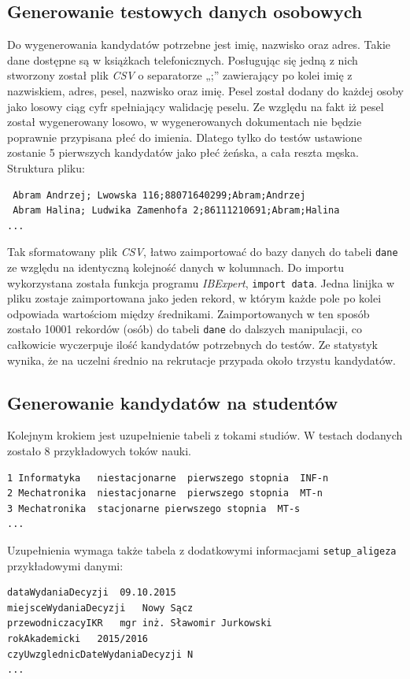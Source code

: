 \subsection{ Generowanie testowych danych osobowych}

Do wygenerowania kandydatów potrzebne jest imię, nazwisko oraz adres. Takie dane dostępne są w książkach telefonicznych. Posługując się jedną z nich stworzony został plik \emph{CSV} o separatorze „;” zawierający po kolei imię z nazwiskiem, adres, pesel, nazwisko oraz imię. Pesel został dodany do każdej osoby jako losowy ciąg cyfr spełniający walidację peselu. Ze względu na fakt iż pesel został wygenerowany losowo,  w wygenerowanych dokumentach nie będzie poprawnie przypisana płeć do imienia. Dlatego tylko do testów ustawione zostanie 5 pierwszych kandydatów jako płeć żeńska, a cała reszta męska.\\
Struktura pliku:
\begin{lstlisting}
 Abram Andrzej; Lwowska 116;88071640299;Abram;Andrzej
 Abram Halina; Ludwika Zamenhofa 2;86111210691;Abram;Halina
...

\end{lstlisting}

Tak sformatowany plik \emph{CSV},  łatwo zaimportować do bazy danych do tabeli \texttt{dane} ze względu na identyczną kolejność danych w kolumnach. Do importu wykorzystana została funkcja programu \emph{IBExpert}, \texttt{import data}. Jedna linijka w pliku zostaje zaimportowana jako jeden rekord, w którym każde pole po kolei odpowiada wartościom między średnikami. Zaimportowanych w ten sposób zostało 10001 rekordów (osób) do tabeli \texttt{dane} do dalszych manipulacji, co całkowicie wyczerpuje ilość kandydatów potrzebnych do testów. Ze statystyk wynika, że na uczelni średnio na rekrutacje przypada około trzystu kandydatów.

\subsection{Generowanie kandydatów na studentów}

Kolejnym krokiem jest uzupełnienie tabeli z tokami studiów. W testach dodanych zostało 8 przykładowych toków nauki. 

\begin{lstlisting}
1 Informatyka	niestacjonarne	pierwszego stopnia	INF-n				
2 Mechatronika	niestacjonarne	pierwszego stopnia	MT-n				
3 Mechatronika	stacjonarne	pierwszego stopnia	MT-s				
...
\end{lstlisting}
Uzupełnienia wymaga także tabela z dodatkowymi informacjami \texttt{setup\_aligeza} przykładowymi danymi:
\begin{lstlisting}
dataWydaniaDecyzji	09.10.2015
miejsceWydaniaDecyzji	Nowy Sącz
przewodniczacyIKR	mgr inż. Sławomir Jurkowski
rokAkademicki	2015/2016
czyUwzglednicDateWydaniaDecyzji	N
...

\end{lstlisting}

